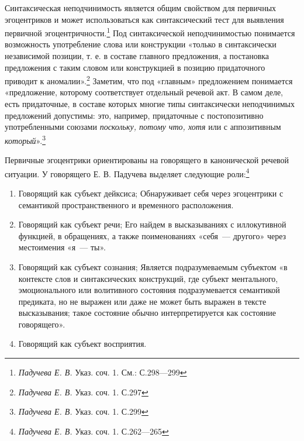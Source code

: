 \documentclass{kursa4}
\begin{document}
      Синтаксическая неподчинимость является общим свойством для первичных
      эгоцентриков и может использоваться как синтаксический тест для
      выявления первичной
      эгоцентричности.\footnote{\textit{{ Падучева Е. В.
      }}{Указ. соч. 1. См.: С.298—299}} Под синтаксической
      неподчинимостью понимается возможность употребление слова или
      конструкции «только в синтаксически независимой позиции, т. е. в
      составе главного предложения, а постановка предложения с таким словом
      или конструкцией в позицию придаточного приводит к
      аномалии».\footnote{\textit{{ Падучева Е. В.
      }}{Указ. соч. 1. С.297}} Заметим, что под «главным»
      предложением понимается «предложение, которому соответствует отдельный
      речевой акт. В самом деле, есть придаточные, в составе которых многие
      типы синтаксически неподчинимых предложений допустимы: это, например,
      придаточные с постопозитивно употребленными союзами \textit{поскольку,
      потому что, хотя} или с аппозитивным
      \textit{который}».\footnote{\textit{{ Падучева Е. В.
      }}{Указ. соч. 1. С.299}}

      Первичные эгоцентрики ориентированы на говорящего в канонической
      речевой ситуации. У говорящего Е. В. Падучева выделяет следующие
      роли:\footnote{\textit{{ Падучева Е. В.
      }}{Указ. соч. 1. С.262—265}}

      \liststyleWWNumiii
      \begin{enumerate}

        \item Говорящий как субъект дейксиса; \newline
        Обнаруживает себя через эгоцентрики с семантикой пространственного и
        временного расположения. 

        \item Говорящий как субъект речи; \newline
        Его найдем в высказываниях с иллокутивной функцией, в обращениях, а
        также поименованиях «себя~--- другого» через местоимения «я~--- ты».

        \item Говорящий как субъект сознания; \newline
        Является подразумеваемым субъектом «в контексте слов и синтаксических
        конструкций, где субъект ментального, эмоционального или волитивного
        состояния подразумевается семантикой предиката, но не выражен или даже
        не может быть выражен в тексте высказывания; такое состояние обычно
        интерпретируется как состояние говорящего». 

        \item Говорящий как субъект восприятия.
       
      \end{enumerate}
\end{document}
